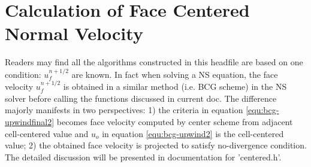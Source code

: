 \section{Calculation of Face Centered Normal Velocity}
Readers may find all the algorithms constructed in this headfile are based on one condition: $u_f^{n+1/2}$ are known. In fact when solving a NS equation, the face velocity $u_f^{n+1/2}$ is obtained in a similar method (i.e. BCG scheme) in the NS solver before calling the functions discussed in current doc\cite{2003_Popinet}. The difference majorly manifests in two perspectives: 1) the criteria in equation \ref{equ:bcg-upwindfinal2} becomes face velocity computed by center scheme from adjacent cell-centered value and $u_o$ in equation \ref{equ:bcg-upwind2} is the cell-centered value; 2) the obtained face velocity is projected to satisfy no-divergence condition. The detailed discussion will be presented in documentation for 'centered.h'.
\printbibliography
